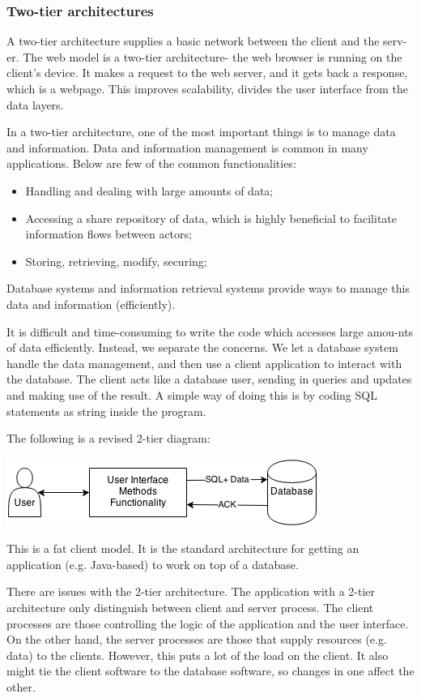 \documentclass[a4paper, openany]{memoir}
\begin{document}
\subsubsection{Two-tier architectures}
A two-tier architecture supplies a basic network between the client and the serv-er. The web model is a two-tier architecture- the web browser is running on the client's device. It makes a request to the web server, and it gets back a response, which is a webpage. This improves scalability, divides the user interface from the data layers.

\noindent In a two-tier architecture, one of the most important things is to manage data and information. Data and information management is common in many applications. Below are few of the common functionalities:
\begin{itemize}
    \item Handling and dealing with large amounts of data;
    \item Accessing a share repository of data, which is highly beneficial to facilitate information flows between actors;
    \item Storing, retrieving, modify, securing;
\end{itemize}
Database systems and information retrieval systems provide ways to manage this data and information (efficiently).

\noindent It is difficult and time-consuming to write the code which accesses large amou-nts of data efficiently. Instead, we separate the concerns. We let a database system handle the data management, and then use a client application to interact with the database. The client acts like a database user, sending in queries and updates and making use of the result. A simple way of doing this is by coding SQL statements as string inside the program.

\noindent The following is a revised 2-tier diagram:
\begin{center}
    \includegraphics[scale=0.8]{src/L7I2.png}
\end{center}
This is a fat client model. It is the standard architecture for getting an application (e.g. Java-based) to work on top of a database.

\noindent There are issues with the 2-tier architecture. The application with a 2-tier architecture only distinguish between client and server process. The client processes are those controlling the logic of the application and the user interface. On the other hand, the server processes are those that supply resources (e.g. data) to the clients. However, this puts a lot of the load on the client. It also might tie the client software to the database software, so changes in one affect the other.
\end{document}
